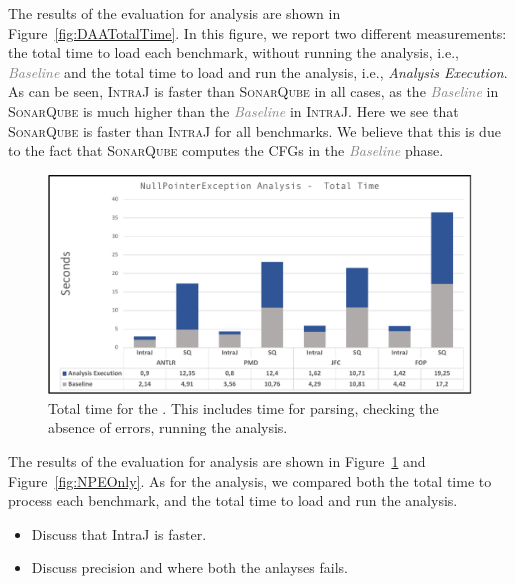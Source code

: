 The results of the evaluation for  analysis are shown in Figure~\ref{fig:DAATotalTime}.
In this figure, we report two different measurements: the total
time to load each benchmark, without running the analysis, i.e., \textcolor{grey}{\emph{Baseline}}
and the total time to load and run the analysis, i.e., \textcolor{NavyBlue}{\emph{Analysis Execution}}.
As can be seen, \textsc{IntraJ} is faster than \textsc{SonarQube} in all cases, as the
\textcolor{grey}{\emph{Baseline}} in \textsc{SonarQube} is much higher than the \textcolor{grey}{\emph{Baseline}} in \textsc{IntraJ}.
Here we see that \textsc{SonarQube} is faster than \textsc{IntraJ} for all benchmarks.
We believe that this is due to the fact that \textsc{SonarQube} computes the CFGs
in the \textcolor{grey}{\emph{Baseline}} phase.

\begin{figure}[H]
  \includegraphics[width=1\linewidth]{kappa/img/NPETotalTime.pdf}
  \caption{\label{fig:NPETotal}Total time for the . This includes time for parsing,
  checking the absence of errors, running the analysis.}
\end{figure}


The results of the evaluation for  analysis are shown in Figure~\ref{fig:NPETotal} and Figure~\ref{fig:NPEOnly}.
As for the  analysis, we compared both the total time to process
each benchmark, and the total time to load and run the analysis.

\begin{itemize}
\item Discuss that IntraJ is faster.
\item Discuss precision and where both the anlayses fails.
\end{itemize}






